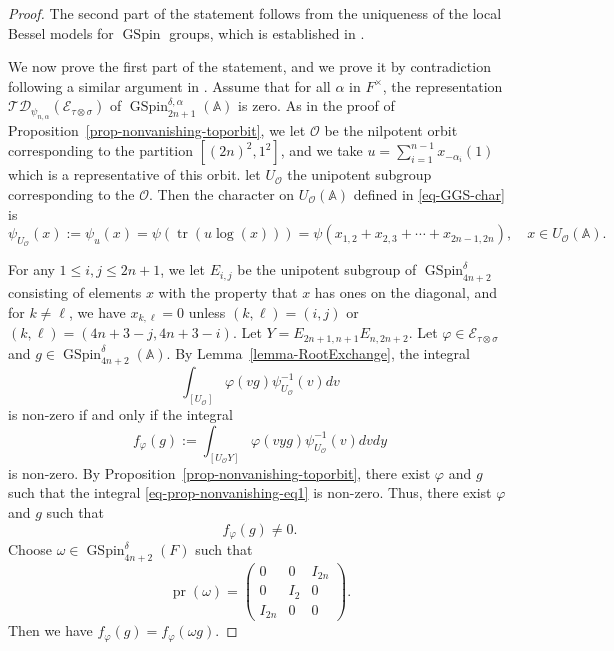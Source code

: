 \documentclass[12pt]{amsart}
\newcommand{\tr}{\operatorname{tr}}
\newcommand{\A}{\mathbb{A}}
\newcommand{\TD}{\mathcal{TD}}
\newcommand{\CE}{{\mathcal{E}}}
\theoremstyle{remark}
\newcommand{\pr}{\operatorname{pr}}
\DeclareMathOperator{\GSpin}{GSpin}
\begin{document}
\begin{proof}
The second part of the statement follows from the uniqueness of the local Bessel models for $\GSpin$ groups, which is established in \cite{Yan2025}.	

We now prove the first part of the statement, and we prove it by contradiction following a similar argument in \cite[Proposition 3.3]{JiangLiuXuZhang2016}. Assume that for all $\alpha$ in $F^\times$, the representation $\TD_{\psi_{n,\alpha}}(\CE_{\tau\otimes\sigma})$ of $\GSpin^{\delta,\alpha}_{2n+1}(\A)$ is zero.
As in the proof of Proposition~\ref{prop-nonvanishing-toporbit}, we let $\mathcal{O}$ be the nilpotent orbit corresponding to the partition $[(2n)^2,1^2]$, and we take $u=\sum_{i=1}^{n-1}x_{-\alpha_i}(1)$ which is a representative of this orbit. let $U_{\mathcal{O}}$ the unipotent subgroup corresponding to the $\mathcal{O}$.
Then the character on $U_{\mathcal{O}}(\A)$ defined in \eqref{eq-GGS-char} is 
\begin{equation*}
\psi_{U_{\mathcal{O}}} (x):=\psi_u(x)= \psi(\tr( u \log(x)) )=	 \psi( x_{1,2}+x_{2,3}+\cdots + x_{2n-1,2n}), \quad x\in U_{\mathcal{O}}(\A).
\end{equation*}

For any $1\le i, j\le 2n+1$, we let $E_{i,j}$ be the unipotent subgroup of $\GSpin_{4n+2}^\delta$ consisting of elements $x$ with the property that $x$ has ones on the diagonal, and for $k\not=\ell$, we have $x_{k,\ell}=0$ unless $(k,\ell)=(i,j)$ or $(k,\ell)=(4n+3-j,4n+3-i)$. 
Let $Y = E_{2n+1,n+1} E_{n,2n+2}$. 
Let $\varphi\in \CE_{\tau\otimes\sigma}$ and $g\in \GSpin_{4n+2}^\delta(\A)$.
By Lemma~\ref{lemma-RootExchange}, the integral 
\begin{equation}
\label{eq-prop-nonvanishing-eq1}
\int_{[U_{\mathcal{O}}]} 	\varphi( vg ) \psi_{U_{\mathcal{O}}}^{-1}(v)dv 
\end{equation}
is non-zero if and only if the integral 
\begin{equation}
\label{eq-prop-nonvanishing-eq2}
f_{\varphi}(g):=\int_{[U_{\mathcal{O}}Y]} 	\varphi( v y g ) \psi_{U_{\mathcal{O}}}^{-1}(v)dv dy
\end{equation}
is non-zero. By Proposition~\ref{prop-nonvanishing-toporbit}, there exist $\varphi$ and $g$ such that the integral \eqref{eq-prop-nonvanishing-eq1} is non-zero. Thus, there exist $\varphi$ and $g$ such that 
 \begin{equation}
\label{eq-prop-nonvanishing-eq3}
f_{\varphi}(g)\not=0.
\end{equation}
Choose $\omega\in \GSpin_{4n+2}^\delta(F)$ such that
\begin{equation}
\label{eq-prop-nonvanishing-eq4}
\pr(\omega)=  \begin{pmatrix}
0 & 0 & I_{2n}\\
0 & I_2 & 0\\
I_{2n} & 0 & 0
\end{pmatrix}.
\end{equation}
Then we have $f_{\varphi}(g)=f_{\varphi}(\omega g)$.


\end{proof}
\end{document}
